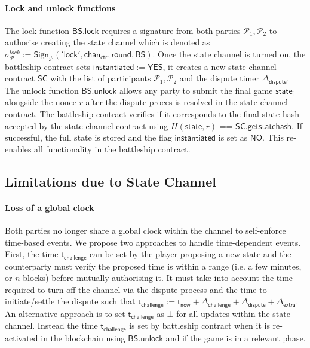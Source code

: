 \documentclass{llncs}
\newcommand{\instantiated}{\mathsf{instantiated}}
\newcommand{\instantiatedno}{\mathsf{NO}}
\newcommand{\instantiatedyes}{\mathsf{YES}}
\newcommand{\stateinfo}{\mathsf{state}}
\newcommand{\stateinfoi}{\mathsf{state}_{\mathsf{i}}}
\newcommand{\participant}{\mathcal{P}}
\newcommand{\statechannel}{\mathsf{SC}}
\newcommand{\statechannelgetcommitment}{\mathsf{SC}.\mathsf{getstatehash}}
\newcommand{\sign}{\mathsf{Sign}}
\newcommand{\battleship}{\mathsf{BS}}
\newcommand{\battleshiplock}{\mathsf{BS.lock}}
\newcommand{\battleshipunlock}{\mathsf{BS.unlock}}
\newcommand{\timerchallenge}{\mathsf{\Delta}_{\mathsf{challenge}}}
\newcommand{\timechallenge}{\mathsf{t}_{\mathsf{challenge}}}
\newcommand{\timerextra}{\mathsf{\Delta}_{\mathsf{extra}}}
\newcommand{\timerdispute}{\mathsf{\Delta}_{\mathsf{dispute}}}
\newcommand{\timenow}{\mathsf{t}_{\mathsf{now}}}
\begin{document}
	\paragraph{Lock and unlock functions} 
	The lock function $\battleshiplock$ requires a signature from both parties $\participant_{1},\participant_{2}$ to authorise creating the state channel which is denoted as $\sigma^{lock}_{\participant} := \sign_{\participant}('\mathsf{lock}', \mathsf{chan}_{\mathsf{ctr}}, \mathsf{round}, \battleship)$.
	Once the state channel is turned on, the battleship contract sets $\instantiated := \instantiatedyes$, it creates a new state channel contract $\statechannel$ with the list of participants $\participant_{1},\participant_{2}$ and the dispute timer $\timerdispute$. 
	The unlock function $\battleshipunlock$ allows any party to submit the final game $\stateinfoi$ alongside the nonce $r$ after the dispute proces is resolved in the state channel contract. 
	The battleship contract verifies if it corresponds to the final state hash accepted by the state channel contract using $H(\stateinfo,r)$ == $\statechannelgetcommitment$.
	If successful, the full state is stored and the flag $\instantiated$ is set as $\instantiatedno$.
	This re-enables all functionality in the battleship contract. 
	
	\subsection{Limitations due to State Channel} 
	
	
	\paragraph{Loss of a global clock} Both parties no longer share a global clock within the channel to self-enforce time-based events.
	We propose two approaches to handle time-dependent events. 
	First, the time $\timechallenge$ can be set by the player proposing a new state and the counterparty must verify the proposed time is within a range (i.e. a few minutes, or $n$ blocks) before mutually authorising it.
	It must take into account the time required to turn off the channel via the dispute process and the time to initiate/settle the dispute such that $\timechallenge := \timenow + \timerchallenge + \timerdispute + \timerextra$. 
	An alternative approach is to set $\timechallenge$ as $\bot$ for all updates within the state channel. 
	Instead the time $\timechallenge$ is set by battleship contract when it is re-activated in the blockchain using $\battleshipunlock$ and if the game is in a relevant phase.
	
\end{document}
